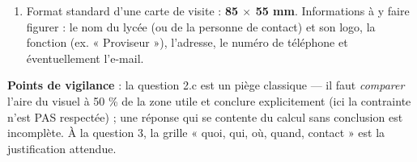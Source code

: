\documentclass[11pt]{article}
\begin{document}
\begin{corrige}
\begin{enumerate}
\begin{itemize}
\item \textbf{Où} : le lieu (salle polyvalente du lycée, ville) ;
\item \textbf{Quand} : les dates et horaires de l'évènement ;
\item \textbf{Contact} : un téléphone ou une adresse pour les renseignements.
\end{itemize}
\item Format standard d'une carte de visite : \textbf{85 $\times$ 55 mm}. Informations à y faire figurer : le nom du lycée (ou de la personne de contact) et son logo, la fonction (ex. « Proviseur »), l'adresse, le numéro de téléphone et éventuellement l'e-mail.
\end{enumerate}
\textbf{Points de vigilance} : la question 2.c est un piège classique — il faut \emph{comparer} l'aire du visuel à 50 \% de la zone utile et conclure explicitement (ici la contrainte n'est PAS respectée) ; une réponse qui se contente du calcul sans conclusion est incomplète. À la question 3, la grille « quoi, qui, où, quand, contact » est la justification attendue.
\end{corrige}
\end{document}
